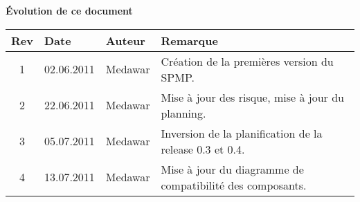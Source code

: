 \begin{large}
\textbf{Évolution de ce  document\\}
\end{large}
\begin{tabular}{|c|l|l|l|}
\hline  Rev &  Date &  Auteur & Remarque \\ 
\hline  1 &  02.06.2011 & Medawar  & Création de la premières version du SPMP. \\ 
\hline  2 &  22.06.2011 & Medawar  & Mise à jour des risque, mise à jour du planning. \\ 
\hline  3 &  05.07.2011 & Medawar  & Inversion de la planification de la release 0.3 et 0.4. \\ 
\hline  4 &  13.07.2011 & Medawar  & Mise à jour du diagramme de compatibilité des composants. \\ 
\hline 
\end{tabular} 